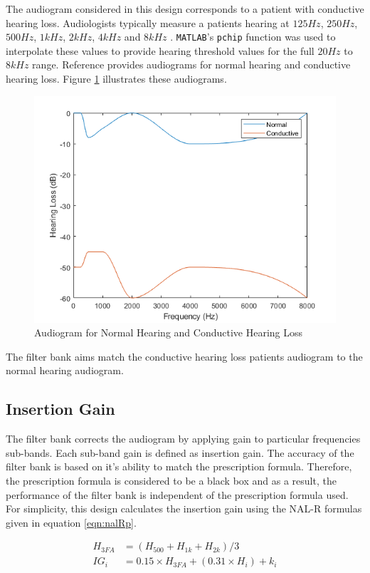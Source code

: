 \documentclass[11pt,onecolumn]{witseiepaper}
\begin{document}
\noindent The audiogram considered in this design corresponds to a patient with conductive hearing loss. Audiologists typically measure a patients hearing at $125Hz$, $250Hz$, $500Hz$, $1kHz$, $2kHz$, $4kHz$ and $8kHz$ \cite{mahmoud}. \texttt{MATLAB}'s \texttt{pchip} function was used to interpolate these values to provide hearing threshold values for the full $20Hz$ to $8kHz$ range. Reference \cite{mahmoud} provides audiograms for normal hearing and conductive hearing loss. Figure \ref{fig:normCondAudio} illustrates these audiograms.

\begin{figure}[h]
\centering
\includegraphics[width=0.6\linewidth]{normCondAudiogram.PNG}
\caption{Audiogram for Normal Hearing and Conductive Hearing Loss}
\label{fig:normCondAudio}
\end{figure}  

\noindent The filter bank aims match the conductive hearing loss patients audiogram to the normal hearing audiogram.

\subsection{Insertion Gain}
\label{sec:insertGain}

\noindent The filter bank corrects the audiogram by applying gain to particular frequencies sub-bands. Each sub-band gain is defined as insertion gain. The accuracy of the filter bank is based on it's ability to match the prescription formula. Therefore, the prescription formula is considered to be a black box and as a result, the performance of the filter bank is independent of the prescription formula used. For simplicity, this design calculates the insertion gain using the NAL-R formulas given in equation \ref{eqn:nalRp}.

\begin{equation}
\label{eqn:nalRp}
\begin{aligned}
H_{3FA} &= (H_{500} + H_{1k} + H_{2k})/3 \\
IG_i &= 0.15 \times H_{3FA} + (0.31\times H_i) + k_i
\end{aligned}
\end{equation}
\end{document}
